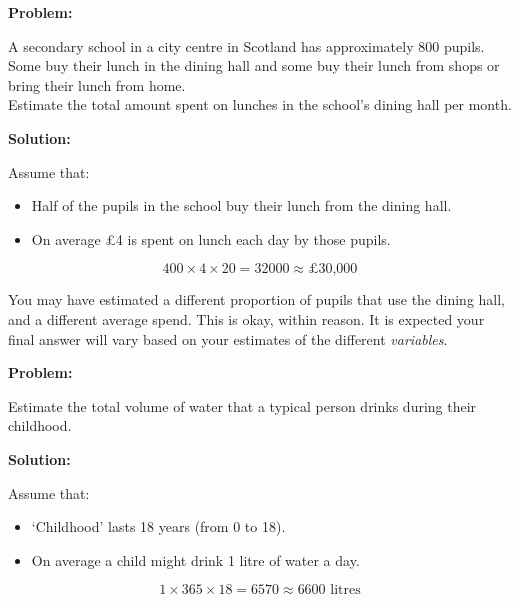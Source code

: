 \documentclass[
  11pt,
  openany]{book}
\begin{document}
\begin{tcolorbox}[title=Example,colback=RoyalBlue!1!,colframe=NavyBlue]
\textbf{Problem:}

A secondary school in a city centre in Scotland has approximately 800 pupils.\\ Some buy their lunch in the dining hall and some buy their lunch from shops or bring their lunch from home.\\ Estimate the total amount spent on lunches in the school's dining hall per month.

\tcblower
\textbf{Solution:}

Assume that:

\begin{itemize}[itemsep=0pt]
    \item Half of the pupils in the school buy their lunch from the dining hall.
    \item On average £4 is spent on lunch each day by those pupils.
\end{itemize}

\[\text{400}\times \text{4} \times \text{20}=\text{32000}\approx \text{£30,000}\]

\end{tcolorbox}

You may have estimated a different proportion of pupils that use the dining hall, and a different average spend. This is okay, within reason. It is expected your final answer will vary based on your estimates of the different \emph{variables}.

\begin{tcolorbox}[title=Example,colback=RoyalBlue!1!,colframe=NavyBlue]
\textbf{Problem:}

Estimate the total volume of water that a typical person drinks during their childhood.

\tcblower
\textbf{Solution:}

Assume that:

\begin{itemize}[itemsep=0pt]
    \item `Childhood' lasts 18 years (from 0 to 18).
    \item On average a child might drink 1 litre of water a day.
\end{itemize}

\[\text{1}\times \text{365} \times \text{18}=\text{6570}\approx \text{6600 litres}\]

\end{tcolorbox}

\pagebreak
\end{document}
